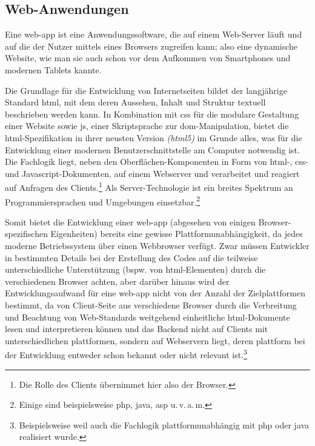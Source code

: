 \subsection{Web-Anwendungen}\label{sec:web-app}

Eine \gls{web-app} ist eine Anwendungssoftware, die auf einem Web-Server läuft und auf die der Nutzer mittels eines Browsers zugreifen kann; also eine dynamische Website, wie man sie auch schon vor dem Aufkommen von Smartphones und modernen Tablets kannte. 

Die Grundlage für die Entwicklung von Internetseiten bildet der langjährige Standard \gls{html}, mit dem deren Aussehen, Inhalt und Struktur textuell beschrieben werden kann. 
In Kombination mit \gls{css} für die modulare Gestaltung einer Website sowie \gls{js}, einer Skriptsprache zur \gls{dom}-Manipulation, bietet die \gls{html}-Spezifikation in ihrer neusten Version \textit{(\gls{html5})} im Grunde alles, was für die Entwicklung einer modernen Benutzerschnittstelle am Computer notwendig ist. 
Die Fachlogik liegt, neben den Oberflächen-Komponenten in Form von \mbox{\gls{html}-,} \gls{css}- und Javascript-Dokumenten, auf einem Webserver und verarbeitet und reagiert auf Anfragen des Clients.\footnote{Die Rolle des Clients übernimmet hier also der Browser.}
Als Server-Technologie ist ein breites Spektrum an Programmiersprachen und Umgebungen einsetzbar.\footnote{Einige sind beispielsweise \gls*{php}, \gls*{java}, \gls*{asp} u.\,v.\,a.\,m.}

Somit bietet die Entwicklung einer \gls{web-app} (abgesehen von einigen Browser-spezifischen Eigenheiten) bereits eine gewisse Plattformunabhängigkeit, da jedes moderne Betriebssystem über einen Webbrowser verfügt. 
Zwar müssen Entwickler in bestimmten Details bei der Erstellung des Codes auf die teilweise unterschiedliche Unterstützung (bspw. von \gls{html}-Elementen)  durch die verschiedenen Browser achten, aber darüber hinaus wird der Entwicklungsaufwand für eine \gls{web-app} nicht von der Anzahl der Zielplattformen bestimmt, da von Client-Seite aus verschiedene Browser durch die Verbreitung und Beachtung von Web-Standards weitgehend einheitliche \gls{html}-Dokumente lesen und interpretieren können und das Back\-end nicht auf Clients mit unterschiedlichen \gls{plattform}en, sondern auf Webservern liegt, deren \gls{plattform} bei der Entwicklung entweder schon bekannt oder nicht relevant ist.\footnote{Beispielsweise weil auch die Fachlogik plattformunabhängig mit \gls*{php} oder \gls*{java} realisiert wurde.}

